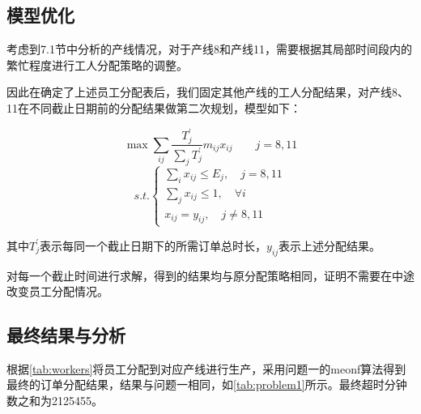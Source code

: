\subsection{模型优化}

考虑到7.1节中分析的产线情况，对于产线8和产线11，需要根据其局部时间段内的繁忙程度进行工人分配策略的调整。

因此在确定了上述员工分配表后，我们固定其他产线的工人分配结果，对产线8、11在不同截止日期前的分配结果做第二次规划，模型如下：

\[
    \max \sum_{ij} \frac{T_j^{\prime}}{\sum_j T_j^{\prime}}  m_{ij}x_{ij} \quad \quad j = 8,11
\]
\[
    s.t.
    \begin{cases}
        \sum_i x_{ij} \leq E_j ,\quad  j  = 8, 11\\
        \sum_j x_{ij} \leq 1 ,\quad \forall i \\ 
        x_{ij} = y_{ij}, \quad j \neq 8, 11
    \end{cases}
\]

其中$T_j^{\prime}$表示每同一个截止日期下的所需订单总时长，$y_{ij}$表示上述分配结果。

对每一个截止时间进行求解，得到的结果均与原分配策略相同，证明不需要在中途改变员工分配情况。

\subsection{最终结果与分析}
根据\cref{tab:workers}将员工分配到对应产线进行生产，采用问题一的meonf算法得到最终的订单分配结果，结果与问题一相同，如\cref{tab:problem1}所示。最终超时分钟数之和为2125455。